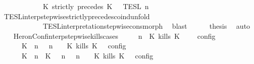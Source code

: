 \begin{isabellebody}
\ \ \ \ \ \ \ \ \ \ {\isacharequal}\ {\isasymlbrakk}{\isasymlbrakk}\ {\isacharparenleft}K\ strictly\ precedes\ K\ {\isacharhash}\ {\isasymPsi}\ {\isasymrbrakk}{\isasymrbrakk}\isactrlsub T\isactrlsub E\isactrlsub S\isactrlsub L\isactrlbsup {\isasymge}\ n\isactrlesup {\isacartoucheclose}\isanewline
\ \ \ \ \ \ \isamarkupfalse%
\ TESL{\isacharunderscore}interp{\isacharunderscore}stepwise{\isacharunderscore}strictly{\isacharunderscore}precedes{\isacharunderscore}coind{\isacharunderscore}unfold\isanewline
\ \ \ \ \ \ \ \ \ \ \ \ TESL{\isacharunderscore}interpretation{\isacharunderscore}stepwise{\isacharunderscore}cons{\isacharunderscore}morph\ \isamarkupfalse%
\ blast\isanewline
\ \ \ \ \isamarkupfalse%
\ {\isacharquery}thesis\ \isamarkupfalse%
\ auto\isanewline
\ \ \isamarkupfalse%
\isanewline
{}\isamarkupfalse%
%
\endisatagproof
{\isafoldproof}%
%
\isadelimproof
\isanewline
%
\endisadelimproof
\isanewline
{}\isamarkupfalse%
\ HeronConf{\isacharunderscore}interp{\isacharunderscore}stepwise{\isacharunderscore}kills{\isacharunderscore}cases{\isacharcolon}\isanewline
\ \ \ {\isacartoucheopen}{\isasymlbrakk}\ {\isasymGamma}{\isacharcomma}\ n\ {\isasymturnstile}\ {\isacharparenleft}{\isacharparenleft}K\ kills\ K\ {\isacharhash}\ {\isasymPsi}{\isacharparenright}\ {\isasymtriangleright}\ {\isasymPhi}\ {\isasymrbrakk}\isactrlsub c\isactrlsub o\isactrlsub n\isactrlsub f\isactrlsub i\isactrlsub g\isanewline
\ \ \ \ {\isacharequal}\ {\isasymlbrakk}\ {\isacharparenleft}{\isacharparenleft}K\ {\isasymnot}{\isasymUp}\ n{\isacharparenright}\ {\isacharhash}\ {\isasymGamma}{\isacharparenright}{\isacharcomma}\ n\ {\isasymturnstile}\ {\isasymPsi}\ {\isasymtriangleright}\ {\isacharparenleft}{\isacharparenleft}K\ kills\ K\ {\isacharhash}\ {\isasymPhi}{\isacharparenright}\ {\isasymrbrakk}\isactrlsub c\isactrlsub o\isactrlsub n\isactrlsub f\isactrlsub i\isactrlsub g\isanewline
\ \ \ \ {\isasymunion}\ {\isasymlbrakk}\ {\isacharparenleft}{\isacharparenleft}K\ {\isasymUp}\ n{\isacharparenright}\ {\isacharhash}\ {\isacharparenleft}K\ {\isasymnot}{\isasymUp}\ {\isasymge}\ n{\isacharparenright}\ {\isacharhash}\ {\isasymGamma}{\isacharparenright}{\isacharcomma}\ n\ {\isasymturnstile}\ {\isasymPsi}\ {\isasymtriangleright}\ {\isacharparenleft}{\isacharparenleft}K\ kills\ K\ {\isacharhash}\ {\isasymPhi}{\isacharparenright}\ {\isasymrbrakk}\isactrlsub c\isactrlsub o\isactrlsub n\isactrlsub f\isactrlsub i\isactrlsub g{\isacartoucheclose}\isanewline

\end{isabellebody}
